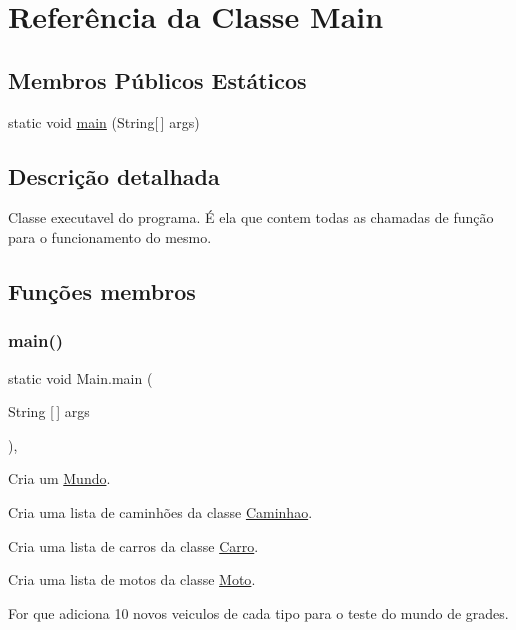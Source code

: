 \hypertarget{class_main}{}\section{Referência da Classe Main}
\label{class_main}
\subsection*{Membros Públicos Estáticos}
\begin{DoxyCompactItemize}
\item 
static void \mbox{\hyperlink{class_main_a8a5d0f827edddff706cc0e6740d0579a}{main}} (String\mbox{[}$\,$\mbox{]} args)
\end{DoxyCompactItemize}


\subsection{Descrição detalhada}
Classe executavel do programa. É ela que contem todas as chamadas de função para o funcionamento do mesmo. 

\subsection{Funções membros}
\mbox{\label{class_main_a8a5d0f827edddff706cc0e6740d0579a}} 
\subsubsection{\texorpdfstring{main()}{main()}}
{\footnotesize\ttfamily static void Main.\+main (\begin{DoxyParamCaption}\item[{String \mbox{[}$\,$\mbox{]}}]{args }\end{DoxyParamCaption})\hspace{0.3cm}{\ttfamily [inline]}, {\ttfamily [static]}}

Cria um \mbox{\hyperlink{class_mundo}{Mundo}}.

Cria uma lista de caminhões da classe \mbox{\hyperlink{class_caminhao}{Caminhao}}.

Cria uma lista de carros da classe \mbox{\hyperlink{class_carro}{Carro}}.

Cria uma lista de motos da classe \mbox{\hyperlink{class_moto}{Moto}}.

For que adiciona 10 novos veiculos de cada tipo para o teste do mundo de grades.

